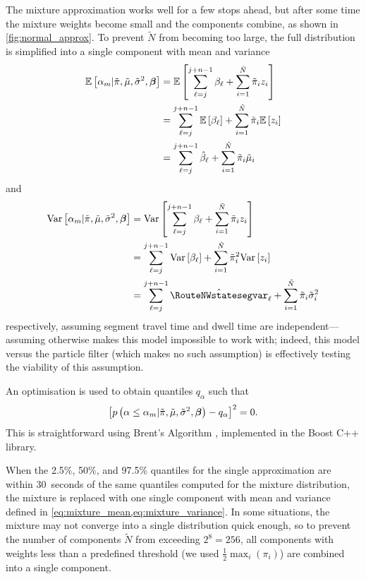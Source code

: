 The mixture approximation works well for a few stops ahead, but after some time the mixture weights become small and the components combine, as shown in \cref{fig:normal_approx}. To prevent $\tilde N$ from becoming too large, the full distribution is simplified into a single component with mean and variance
\begin{equation}
\label{eq:mixture_mean}
\begin{split}
\mathbb{E}\left[\alpha_m | \tilde\pi, \tilde\mu, \tilde\sigma^2, \boldsymbol\beta\right] &=
\mathbb{E}\left[\sum_{\ell=j}^{j+n-1} \beta_\ell +
  \sum_{i=1}^{\tilde N} \tilde\pi_i z_i\right] \\
&= \sum_{\ell=j}^{j+n-1} \mathbb{E}\left[\beta_\ell\right] +
  \sum_{i=1}^{\tilde N} \tilde\pi_i \mathbb{E}\left[z_i\right] \\
&= \sum_{\ell=j}^{j+n-1} \hat{\beta}_\ell +
  \sum_{i=1}^{\tilde N} \tilde\pi_i \tilde\mu_i
\end{split}
\end{equation}
and
\begin{equation}
\label{eq:mixture_variance}
\begin{split}
\Var{\Tarr_m | \tilde\pi, \tilde\mu, \tilde\sigma^2, \RouteNWstate} &=
\Var{\sum_{\ell=j}^{j+n-1} \RouteNWstateseg_\ell +
  \sum_{i=1}^{\tilde N} \tilde\pi_i z_i} \\
&= \sum_{\ell=j}^{j+n-1} \Var{\RouteNWstateseg_\ell} +
  \sum_{i=1}^{\tilde N} \tilde\pi_i^2 \Var{z_i} \\
&= \sum_{\ell=j}^{j+n-1} \hat\RouteNWstatesegvar_\ell +
  \sum_{i=1}^{\tilde N} \tilde\pi_i \tilde\sigma_i^2
\end{split}
\end{equation}
respectively, assuming segment travel time and dwell time are independent---assuming otherwise makes this model impossible to work with; indeed, this model versus the particle filter (which makes no such assumption) is effectively testing the viability of this assumption.


An optimisation is used to obtain quantiles $q_\alpha$ such that
\begin{equation}
\label{eq:mixture_quadratic}
\left[
  p\left(\alpha \leq \alpha_m | \tilde\pi, \tilde\mu, \tilde\sigma^2, \boldsymbol\beta\right) - q_\alpha
\right]^2 = 0.
\end{equation}
This is straightforward using Brent's Algorithm \citep{Brent_1971}, implemented in the Boost \textsf{C++} library.

When the 2.5\%, 50\%, and 97.5\% quantiles for the single approximation are within 30~seconds of the same quantiles computed for the mixture distribution, the mixture is replaced with one single component with mean and variance defined in \cref{eq:mixture_mean,eq:mixture_variance}. In some situations, the mixture may not converge into a single distribution quick enough, so to prevent the number of components $\tilde N$ from exceeding $2^8=256$, all components with weights less than a predefined threshold (we used $\frac{1}{2}\max_i(\pi_i)$) are combined into a single component.
